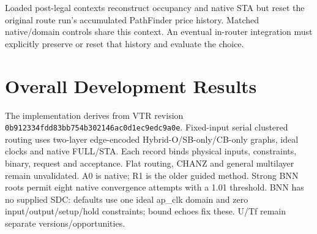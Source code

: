 \documentclass[conference,10pt]{IEEEtran}
\begin{document}
Loaded post-legal contexts reconstruct occupancy and native STA but reset the original route run's accumulated PathFinder price history. Matched native/domain controls share this context. An eventual in-router integration must explicitly preserve or reset that history and evaluate the choice.

\section{Overall Development Results}
The implementation derives from VTR revision \texttt{0b912334fdd83bb754b302146ac0d1ec9edc9a0e}. Fixed-input serial clustered routing uses two-layer edge-encoded Hybrid-O/SB-only/CB-only graphs, ideal clocks and native FULL/STA. Each record binds physical inputs, constraints, binary, request and acceptance. Flat routing, CHANZ and general multilayer remain unvalidated. A0 is native; R1 is the older guided method. Strong BNN roots permit eight native convergence attempts with a 1.01 threshold. BNN has no supplied SDC: defaults use one ideal ap\_clk domain and zero input/output/setup/hold constraints; bound echoes fix these. U/Tf remain separate versions/opportunities.
\end{document}
